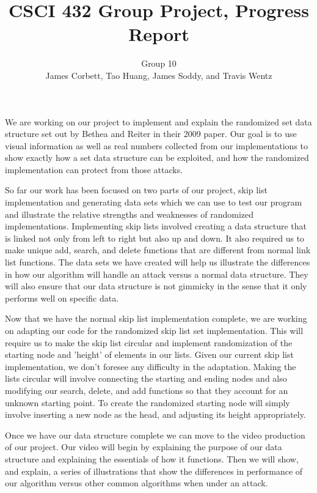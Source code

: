 \documentclass[11pt,twocolumn]{article}
\title{CSCI 432 Group Project, Progress Report}
\author{Group 10\\
\small{James Corbett, Tao Huang, James Soddy, and Travis Wentz}}
\begin{document}
\maketitle

We are working on our project to implement and explain the randomized
set data structure set out by Bethea and Reiter in their 2009 
paper\cite{Bethea09}. Our goal is to use visual information as well
as real numbers collected from our implementations to show exactly
how a set data structure can be exploited, and how the randomized
implementation can protect from those attacks.

So far our work has been focused on two parts of our project, skip list implementation and 
generating data sets which we can use to test our program and illustrate the relative
strengths and weaknesses of randomized implementations. Implementing skip lists involved 
creating a data structure that is linked not only from left to right but also up and down. 
It also required us to make unique add, search, and delete functions that are different from 
normal link list functions. The data sets we have created will help us illustrate the 
differences in how our algorithm will handle an attack versus a normal data structure. 
They will also ensure that our data structure is not gimmicky in the sense that it only 
performs well on specific data.

Now that we have the normal skip list implementation complete, we are working on adapting our
code for the randomized skip list set implementation. This will require us to make the skip 
list circular and implement randomization of the starting node and 'height' of elements in our
lists. Given our current skip list implementation, we don't foresee any difficulty in the adaptation. 
Making the lists circular will involve connecting the starting and ending nodes and also modifying 
our search, delete, and add functions so that they account for an unknown starting point. 
To create the randomized starting node will simply involve inserting a new node as the head,
and adjusting its height appropriately.

Once we have our data structure complete we can move 
to the video production of our project. Our video will begin by explaining the purpose of 
our data structure and explaining the essentials of how it functions. Then we will show, 
and explain, a series of illustrations that show the differences in performance of our 
algorithm versus other common algorithms when under an attack. 
\end{document}
